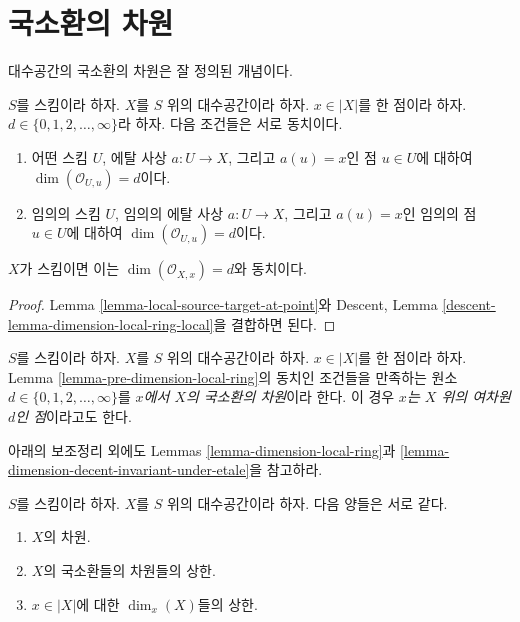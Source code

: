 \section{국소환의 차원}
\label{section-dimension-local-ring}

\noindent
대수공간의 국소환의 차원은 잘 정의된 개념이다.

\begin{lemma}
\label{lemma-pre-dimension-local-ring}
$S$를 스킴이라 하자.
$X$를 $S$ 위의 대수공간이라 하자.
$x \in |X|$를 한 점이라 하자.
$d \in \{0, 1, 2, \ldots, \infty\}$라 하자.
다음 조건들은 서로 동치이다.
\begin{enumerate}
\item 어떤 스킴 $U$, 에탈 사상 $a : U \to X$, 그리고 $a(u) = x$인 점
$u \in U$에 대하여 $\dim(\mathcal{O}_{U, u}) = d$이다.
\item 임의의 스킴 $U$, 임의의 에탈 사상 $a : U \to X$, 그리고
$a(u) = x$인 임의의 점 $u \in U$에 대하여
$\dim(\mathcal{O}_{U, u}) = d$이다.
\end{enumerate}
$X$가 스킴이면 이는 $\dim(\mathcal{O}_{X, x}) = d$와 동치이다.
\end{lemma}

\begin{proof}
Lemma \ref{lemma-local-source-target-at-point}와 Descent, Lemma
\ref{descent-lemma-dimension-local-ring-local}을 결합하면 된다.
\end{proof}

\begin{definition}
\label{definition-dimension-local-ring}
$S$를 스킴이라 하자. $X$를 $S$ 위의 대수공간이라 하자.
$x \in |X|$를 한 점이라 하자. Lemma
\ref{lemma-pre-dimension-local-ring}의 동치인 조건들을 만족하는 원소
$d \in \{0, 1, 2, \ldots, \infty\}$를
{\it $x$에서 $X$의 국소환의 차원}이라 한다. 이 경우
{\it $x$는 $X$ 위의 여차원 $d$인 점}이라고도 한다.
\end{definition}

\noindent
아래의 보조정리 외에도 Lemmas \ref{lemma-dimension-local-ring}과
\ref{lemma-dimension-decent-invariant-under-etale}을 참고하라.

\begin{lemma}
\label{lemma-dimension}
$S$를 스킴이라 하자. $X$를 $S$ 위의 대수공간이라 하자.
다음 양들은 서로 같다.
\begin{enumerate}
\item $X$의 차원.
\item $X$의 국소환들의 차원들의 상한.
\item $x \in |X|$에 대한 $\dim_x(X)$들의 상한.
\end{enumerate}
\end{lemma}

